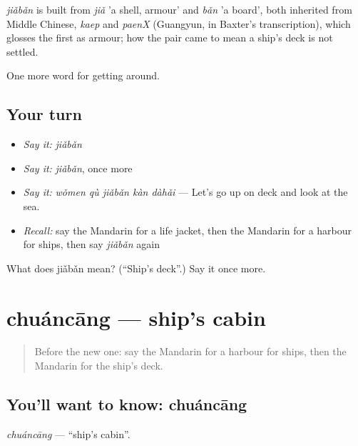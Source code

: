 \begin{cousinweb}
\emph{jiǎbǎn} is built from \emph{jiǎ} 'a shell, armour' and \emph{bǎn} 'a board', both inherited from Middle Chinese, \emph{kaep} and \emph{paenX} (Guangyun, in Baxter's transcription), which glosses the first as armour; how the pair came to mean a ship's deck is not settled.
\end{cousinweb}

\begin{grammarlens}[title={What you've built}]
One more word for getting around.
\end{grammarlens}

\subsection*{Your turn}
\begin{itemize}
\raggedright
  \item \emph{Say it:} \emph{jiǎbǎn}
  \item \emph{Say it:} \emph{jiǎbǎn}, once more
  \item \emph{Say it:} \emph{wǒmen qù jiǎbǎn kàn dàhǎi} — Let's go up on deck and look at the sea.
  \item \emph{Recall:} say the Mandarin for a life jacket, then the Mandarin for a harbour for ships, then say \emph{jiǎbǎn} again
\end{itemize}

\begin{tcolorbox}[breakable,colback=teal!4,colframe=teal!35!black,title={Before you move on}]
What does jiǎbǎn mean? (\textquotedblleft{}Ship's deck\textquotedblright{}.) Say it once more.
\end{tcolorbox}
\section[chuáncāng]{chuáncāng — ship's cabin}

\label{lesson:ZH-C412-chuancang}



\begin{quote}
Before the new one: say the Mandarin for a harbour for ships, then the Mandarin for the ship's deck.
\end{quote}

\subsection*{You'll want to know: chuáncāng}
\emph{chuáncāng} — \textquotedblleft{}ship's cabin\textquotedblright{}.

